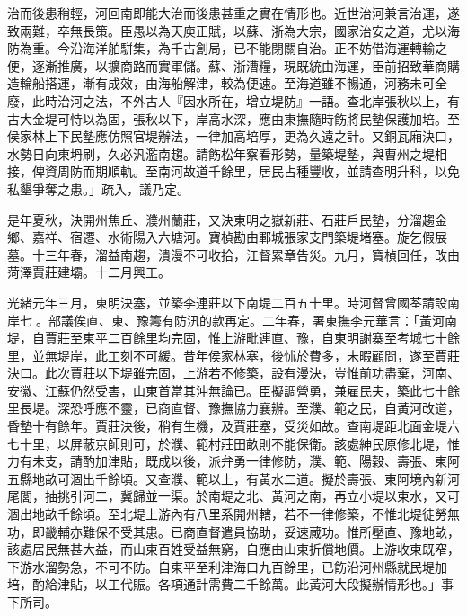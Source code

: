 \begin{pinyinscope}
治而後患稍輕，河回南即能大治而後患甚重之實在情形也。近世治河兼言治運，遂致兩難，卒無長策。臣愚以為天庾正賦，以蘇、浙為大宗，國家治安之道，尤以海防為重。今沿海洋舶駢集，為千古創局，已不能閉關自治。正不妨借海運轉輸之便，逐漸推廣，以擴商路而實軍儲。蘇、浙漕糧，現既統由海運，臣前招致華商購造輪船搭運，漸有成效，由海船解津，較為便速。至海道雖不暢通，河務未可全廢，此時治河之法，不外古人『因水所在，增立堤防』一語。查北岸張秋以上，有古大金堤可恃以為固，張秋以下，岸高水深，應由東撫隨時飭將民墊保護加培。至侯家林上下民墊應仿照官堤辦法，一律加高培厚，更為久遠之計。又銅瓦廂決口，水勢日向東坍刷，久必汎濫南趨。請飭松年察看形勢，量築堤墊，與曹州之堤相接，俾資周防而期順軌。至南河故道千餘里，居民占種豐收，並請查明升科，以免私墾爭奪之患。」疏入，議乃定。

是年夏秋，決開州焦丘、濮州蘭莊，又決東明之嶽新莊、石莊戶民墊，分溜趨金鄉、嘉祥、宿遷、水術陽入六塘河。寶楨勘由鄆城張家支門築堤堵塞。旋乞假展墓。十三年春，溜益南趨，潰漫不可收拾，江督累章告災。九月，寶楨回任，改由菏澤賈莊建壩。十二月興工。

光緒元年三月，東明決塞，並築李連莊以下南堤二百五十里。時河督曾國荃請設南岸七。部議俟直、東、豫籌有防汛的款再定。二年春，署東撫李元華言：「黃河南堤，自賈莊至東平二百餘里均完固，惟上游毗連直、豫，自東明謝寨至考城七十餘里，並無堤岸，此工刻不可緩。昔年侯家林塞，後怵於費多，未暇顧問，遂至賈莊決口。此次賈莊以下堤雖完固，上游若不修築，設有漫決，豈惟前功盡棄，河南、安徽、江蘇仍然受害，山東首當其沖無論已。臣擬調營勇，兼雇民夫，築此七十餘里長堤。深恐呼應不靈，已商直督、豫撫協力襄辦。至濮、範之民，自黃河改道，昏墊十有餘年。賈莊決後，稍有生機，及賈莊塞，受災如故。查南堤距北面金堤六七十里，以屏蔽京師則可，於濮、範村莊田畝則不能保衛。該處紳民原修北堤，惟力有未支，請酌加津貼，既成以後，派弁勇一律修防，濮、範、陽穀、壽張、東阿五縣地畝可涸出千餘頃。又查濮、範以上，有黃水二道。擬於壽張、東阿境內新河尾閭，抽挑引河二，冀歸並一渠。於南堤之北、黃河之南，再立小堤以束水，又可涸出地畝千餘頃。至北堤上游內有八里系開州轄，若不一律修築，不惟北堤徒勞無功，即畿輔亦難保不受其患。已商直督遣員協助，妥速蕆功。惟所壓直、豫地畝，該處居民無甚大益，而山東百姓受益無窮，自應由山東折償地價。上游收束既窄，下游水溜勢急，不可不防。自東平至利津海口九百餘里，已飭沿河州縣就民堤加培，酌給津貼，以工代賑。各項通計需費二千餘萬。此黃河大段擬辦情形也。」事下所司。


\end{pinyinscope}
